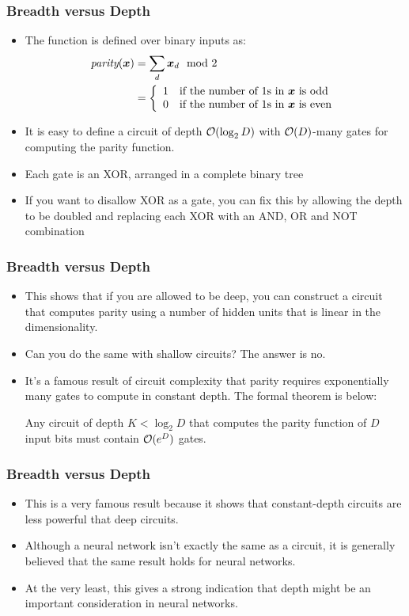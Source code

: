 \documentclass[trans]{beamer}
\begin{document}
\begin{frame}
  \frametitle{Breadth versus Depth}
\begin{itemize}
\item
  The function is defined over binary inputs as:
%
\begin{align}
\textit{parity}({\boldsymbol{x}})
&= \sum_d {\boldsymbol{x}}_d \mod 2 \\
&= \left\{\begin{array}{ll} 1 & \text{if the number of $1$s in ${\boldsymbol{x}}$ is odd} \\
           0 & \text{if the number of $1$s in ${\boldsymbol{x}}$ is even} \end{array}\right.
\end{align}
%
%
\item It is easy to define a circuit of depth $\mathcal{O}(\log_2 D)$ with
$\mathcal{O}(D)$-many gates for computing the parity function.
\item  Each gate is
an XOR, arranged in a complete binary tree
\item If you want to disallow XOR as a
gate, you can fix this by allowing the depth to be doubled and
replacing each XOR with an AND, OR and NOT combination
\end{itemize}
\end{frame}

\begin{frame}
  \frametitle{Breadth versus Depth}
\begin{itemize}
\item
This shows that if you are allowed to be deep, you can construct a
circuit  that computes parity using a number of hidden units that
is linear in the dimensionality.
\item   Can you do the same with shallow
circuits?  The answer is no. 
\item  It's a famous result of circuit
complexity that parity requires exponentially many gates to compute in
constant depth.  The formal theorem is below:
\begin{theorem} \label{thm:nnet:parity}
  Any circuit of depth $K < \log_2 D$ that computes the parity
  function of $D$ input bits must contain $\mathcal{O}(e^D)$ gates.
\end{theorem}
\end{itemize}
\end{frame}

\begin{frame}
  \frametitle{Breadth versus Depth}
\begin{itemize}
\item
This is a very famous result because it shows that constant-depth
circuits are less powerful that deep circuits.  
\item Although a neural
network isn't exactly the same as a circuit, it is generally believed
that the same result holds for neural networks.
\item  At the very least,
this gives a strong indication that depth might be an important
consideration in neural networks.
\end{itemize}
\end{frame}
\end{document}
